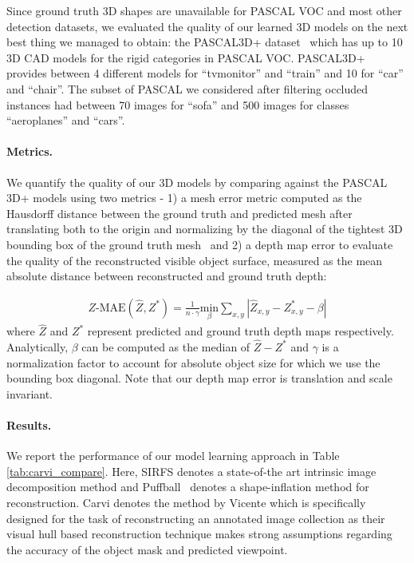 Since ground truth 3D shapes are unavailable for PASCAL VOC and most other detection datasets, we evaluated the quality of our learned 3D models on the next best thing we managed to obtain: the PASCAL3D+ dataset~\cite{pascal3d} which has up to 10 3D CAD models for the rigid categories in PASCAL VOC. PASCAL3D+ provides between 4 different models for ``tvmonitor'' and ``train'' and 10 for ``car'' and ``chair''.
The subset of PASCAL we considered after filtering occluded instances had between 70 images for ``sofa'' and 500 images for classes ``aeroplanes'' and ``cars''.


\paragraph{Metrics.} We quantify the quality of our 3D models by comparing against the PASCAL 3D+ models using two metrics - 1) a mesh error metric computed as the Hausdorff distance between the ground truth and predicted mesh after translating both to the origin and normalizing by the diagonal of the tightest 3D bounding box of the ground truth mesh~\cite{aspert2002mesh} and 2) a depth map error to evaluate the quality of the reconstructed visible object surface, measured as the mean absolute distance between reconstructed and ground truth depth:

\begin{gather}
 Z\text{-MAE}(\hat{Z},Z^{*})=\frac{1}{n\cdot\gamma}\underset{\beta}{\text{min}}\underset{x,y}{\sum}|\hat{Z}_{x,y}-Z^*_{x,y}-\beta|
\end{gather}
where $\hat{Z}$ and $Z^*$ represent predicted and ground truth depth maps respectively. Analytically, $\beta$ can be computed as the median of $\hat{Z}-Z^*$ and $\gamma$ is a normalization factor to account for absolute object size for which we use the bounding box diagonal. Note that our depth map error is translation and scale invariant.

\paragraph{Results.}
We report the performance of our model learning approach in Table \ref{tab:carvi_compare}. Here, SIRFS denotes a state-of-the art intrinsic image decomposition method and Puffball~\cite{twarog2012playing} denotes a shape-inflation method for reconstruction.  Carvi denotes the method by Vicente \etal \cite{carvi14} which is specifically designed for the task of reconstructing an annotated image collection as their visual hull based reconstruction technique makes strong assumptions regarding the accuracy of the object mask and predicted viewpoint.

